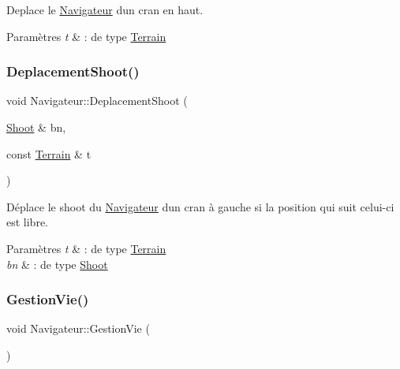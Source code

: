 Deplace le \hyperlink{class_navigateur}{Navigateur} d\textquotesingle{}un cran en haut. 


\begin{DoxyParams}{Paramètres}
{\em t} & \+: de type \hyperlink{class_terrain}{Terrain} \\
\hline
\end{DoxyParams}
\mbox{\label{class_navigateur_a082da7d5d52c149fa234cb856e19c455}} 
\subsubsection{\texorpdfstring{Deplacement\+Shoot()}{DeplacementShoot()}}
{\footnotesize\ttfamily void Navigateur\+::\+Deplacement\+Shoot (\begin{DoxyParamCaption}\item[{\hyperlink{class_shoot}{Shoot} \&}]{bn,  }\item[{const \hyperlink{class_terrain}{Terrain} \&}]{t }\end{DoxyParamCaption})}



Déplace le shoot du \hyperlink{class_navigateur}{Navigateur} d\textquotesingle{}un cran à gauche si la position qui suit celui-\/ci est libre. 


\begin{DoxyParams}{Paramètres}
{\em t} & \+: de type \hyperlink{class_terrain}{Terrain} \\
\hline
{\em bn} & \+: de type \hyperlink{class_shoot}{Shoot} \\
\hline
\end{DoxyParams}
\mbox{\label{class_navigateur_acfd9f284039fa874e7dc146c5cbc9867}} 
\subsubsection{\texorpdfstring{Gestion\+Vie()}{GestionVie()}}
{\footnotesize\ttfamily void Navigateur\+::\+Gestion\+Vie (\begin{DoxyParamCaption}{ }\end{DoxyParamCaption})}



